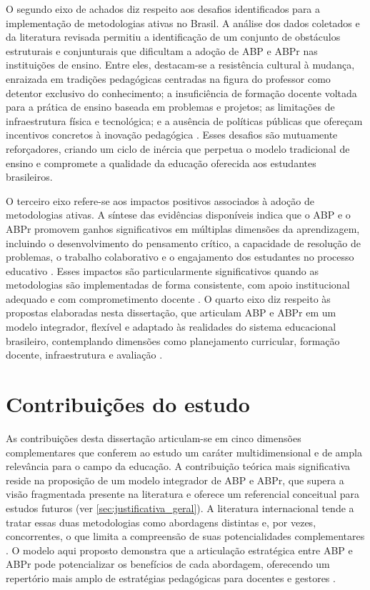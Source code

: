 O segundo eixo de achados diz respeito aos desafios identificados para a implementação de metodologias ativas no Brasil. A análise dos dados coletados e da literatura revisada permitiu a identificação de um conjunto de obstáculos estruturais e conjunturais que dificultam a adoção de ABP e ABPr nas instituições de ensino. Entre eles, destacam-se a resistência cultural à mudança, enraizada em tradições pedagógicas centradas na figura do professor como detentor exclusivo do conhecimento; a insuficiência de formação docente voltada para a prática de ensino baseada em problemas e projetos; as limitações de infraestrutura física e tecnológica; e a ausência de políticas públicas que ofereçam incentivos concretos à inovação pedagógica \cite{LIBANEO2006}. Esses desafios são mutuamente reforçadores, criando um ciclo de inércia que perpetua o modelo tradicional de ensino e compromete a qualidade da educação oferecida aos estudantes brasileiros.

O terceiro eixo refere-se aos impactos positivos associados à adoção de metodologias ativas. A síntese das evidências disponíveis indica que o ABP e o ABPr promovem ganhos significativos em múltiplas dimensões da aprendizagem, incluindo o desenvolvimento do pensamento crítico, a capacidade de resolução de problemas, o trabalho colaborativo e o engajamento dos estudantes no processo educativo \cite{SOUSA2025}. Esses impactos são particularmente significativos quando as metodologias são implementadas de forma consistente, com apoio institucional adequado e com comprometimento docente \cite{TEODORO2024}. O quarto eixo diz respeito às propostas elaboradas nesta dissertação, que articulam ABP e ABPr em um modelo integrador, flexível e adaptado às realidades do sistema educacional brasileiro, contemplando dimensões como planejamento curricular, formação docente, infraestrutura e avaliação \cite{BACICH2018}.

\section{Contribuições do estudo}
\label{sec:contribuicoes}

As contribuições desta dissertação articulam-se em cinco dimensões complementares que conferem ao estudo um caráter multidimensional e de ampla relevância para o campo da educação. A contribuição teórica mais significativa reside na proposição de um modelo integrador de ABP e ABPr, que supera a visão fragmentada presente na literatura e oferece um referencial conceitual para estudos futuros (ver \ref{sec:justificativa_geral}). A literatura internacional tende a tratar essas duas metodologias como abordagens distintas e, por vezes, concorrentes, o que limita a compreensão de suas potencialidades complementares \cite{BACICH2018}. O modelo aqui proposto demonstra que a articulação estratégica entre ABP e ABPr pode potencializar os benefícios de cada abordagem, oferecendo um repertório mais amplo de estratégias pedagógicas para docentes e gestores \cite{VEIGA2014}.

